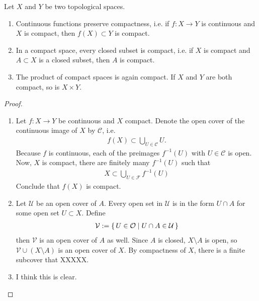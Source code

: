 \begin{thmbox}
    \begin{proposition}
        Let \(X\) and \(Y\) be two topological spaces.
        \begin{enumerate}
            \item Continuous functions preserve compactness, i.e. if \(f: X \longrightarrow Y\) is continuous and \(X\) is compact, then \(f(X) \subset Y\) is compact.
            \item In a compact space, every closed subset is compact, i.e. if \(X\) is compact and \(A \subset X\) is a closed subset, then \(A\) is compact.
            \item The product of compact spaces is again compact. If \(X\) and \(Y\) are both compact, so is \(X \times Y\).
        \end{enumerate}
    \end{proposition}
\end{thmbox}

\begin{proof}
    \begin{enumerate}
        \item Let \(f: X \longrightarrow Y\) be continuous and \(X\) compact. Denote the open cover of the continuous image of \(X\) by \(\mathcal{C}\), i.e.
        \begin{align*}
            f(X) \subset \bigcup_{U \in \mathcal{C}} U \text{.}
        \end{align*}
        Because \(f\) is continuous, each of the preimages \(f^{-1}(U)\) with \(U \in \mathcal{C}\) is open. Now, \(X\) is compact, there are finitely many \(f^{-1}(U)\) such that
        \begin{align*}
            X \subset \bigcup_{U \in \mathcal{F}} f^{-1}(U)
        \end{align*}
        Conclude that \(f(X)\) is compact.
        \item Let \(\mathcal{U}\) be an open cover of \(A\). Every open set in \(\mathcal{U}\) is in the form \(U \cap A\) for some open set \(U \subset X\). Define
        \begin{align*}
            \mathcal{V} := \left\{\, U \in \mathcal{O} \mid U \cap A \in \mathcal{U} \,\right\}
        \end{align*}
        then \(\mathcal{V}\) is an open cover of \(A\) as well. Since \(A\) is closed, \(X \setminus A\) is open, so \(\mathcal{V} \cup (X \setminus A)\) is an open cover of \(X\). By compactness of \(X\), there is a finite subcover that XXXXX.
        \item I think this is clear.
    \end{enumerate}
\end{proof}

